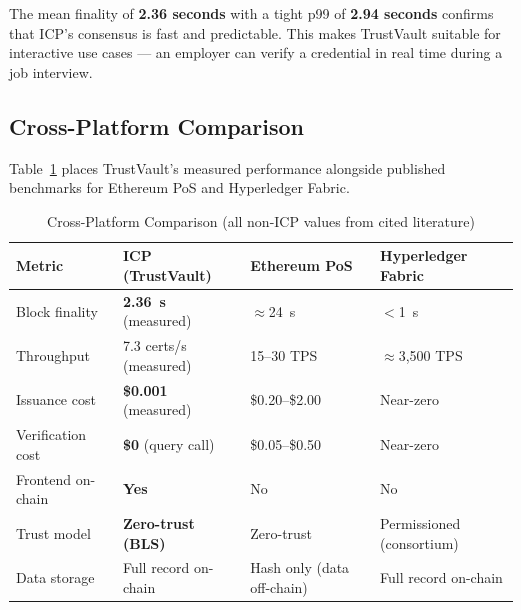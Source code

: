 \documentclass[conference]{IEEEtran}
\begin{document}
The mean finality of \textbf{2.36 seconds} with a tight p99 of \textbf{2.94 seconds} confirms that ICP's consensus is fast and predictable. This makes TrustVault suitable for interactive use cases — an employer can verify a credential in real time during a job interview.

\subsection{Cross-Platform Comparison}

Table~\ref{tab:comparison} places TrustVault's measured performance alongside published benchmarks for Ethereum PoS and Hyperledger Fabric.

\begin{table}[t]
\caption{Cross-Platform Comparison (all non-ICP values from cited literature)}
\label{tab:comparison}
\centering\small\renewcommand{\arraystretch}{1.2}
\begin{tabular}{@{}llll@{}}
\toprule
\textbf{Metric} & \textbf{ICP (TrustVault)} & \textbf{Ethereum PoS} & \textbf{Hyperledger Fabric} \\
\midrule
Block finality        & \textbf{2.36~s} (measured)    & $\approx$24~s~\cite{buterin2020eth2}  & $<$1~s~\cite{androulaki2018fabric} \\
Throughput            & 7.3 certs/s (measured)        & 15--30 TPS~\cite{dinh2017blockbench}  & $\approx$3{,}500 TPS~\cite{androulaki2018fabric} \\
Issuance cost         & \textbf{\$0.001} (measured)   & \$0.20--\$2.00~\cite{wood2014ethereum} & Near-zero \\
Verification cost     & \textbf{\$0} (query call)     & \$0.05--\$0.50~\cite{wood2014ethereum} & Near-zero \\
Frontend on-chain     & \textbf{Yes}                  & No                                     & No \\
Trust model           & \textbf{Zero-trust (BLS)}     & Zero-trust                             & Permissioned (consortium) \\
Data storage          & Full record on-chain          & Hash only (data off-chain)             & Full record on-chain \\
\bottomrule
\end{tabular}
\end{table}
\end{document}
